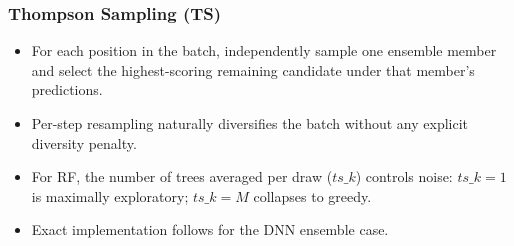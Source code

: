\subsubsection{Thompson Sampling (TS)}
\begin{itemize}
  \item For each position in the batch, independently sample one ensemble member and select the highest-scoring remaining candidate under that member's predictions.
  \item Per-step resampling naturally diversifies the batch without any explicit diversity penalty.
  \item For RF, the number of trees averaged per draw ($\mathit{ts\_k}$) controls noise: $\mathit{ts\_k}=1$ is maximally exploratory; $\mathit{ts\_k}=M$ collapses to greedy.
  \item Exact implementation follows \cite{li2024active} for the DNN ensemble case.
\end{itemize}
